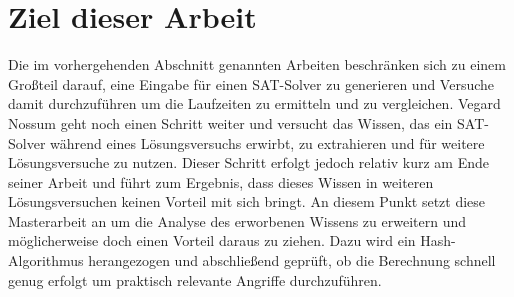 \section{Ziel dieser Arbeit}

Die im vorhergehenden Abschnitt genannten Arbeiten beschränken sich zu einem Großteil darauf, eine Eingabe für
einen SAT-Solver zu generieren und Versuche damit durchzuführen um die Laufzeiten zu ermitteln und zu vergleichen.
Vegard Nossum geht noch einen Schritt weiter und versucht das Wissen, das ein SAT-Solver während eines Lösungsversuchs
erwirbt, zu extrahieren und für weitere Lösungsversuche zu nutzen. Dieser Schritt erfolgt jedoch relativ kurz am Ende
seiner Arbeit und führt zum Ergebnis, dass dieses Wissen in weiteren Lösungsversuchen keinen Vorteil mit sich bringt.
An diesem Punkt setzt diese Masterarbeit an um die Analyse des erworbenen Wissens zu erweitern und möglicherweise doch
einen Vorteil daraus zu ziehen. Dazu wird ein Hash-Algorithmus herangezogen und abschließend geprüft, ob die Berechnung
schnell genug erfolgt um praktisch relevante Angriffe durchzuführen.
